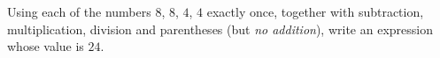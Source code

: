Using each of the numbers $8$, $8$, $4$, $4$ exactly once, together with subtraction, multiplication, division and parentheses (but \emph{no addition}), write an expression whose value is $24$.
